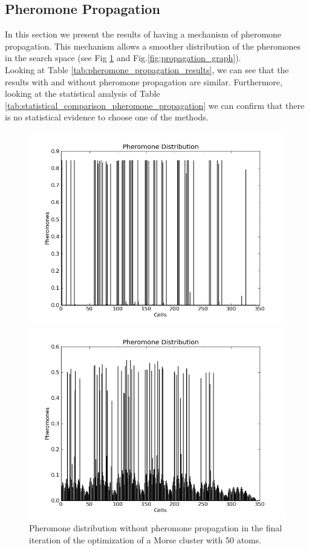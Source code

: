 		\subsection{Pheromone Propagation}
		In this section we present the results of having a mechanism of pheromone propagation. This mechanism allows a smoother distribution of the pheromones in the search space (see Fig \ref{fig:no_propagation_graph} and Fig.\ref{fig:propagation_graph}).\\
		Looking at Table \ref{tab:pheromone_propagation_results}, we can see that the results with and without pheromone propagation are similar. Furthermore, looking at the statistical analysis of Table \ref{tab:statistical_comparison_pheromone_propagation} we can confirm that there is no statistical evidence to choose one of the methods. 
		\begin{figure}[ht]
		\begin{minipage}[b]{0.5\linewidth}
		\centering
		\includegraphics[scale=0.35]{pictures/no_propagation_graph}
		\caption{Pheromone distribution without pheromone propagation in the final iteration of the optimization of a Morse cluster with 50 atoms.}
		\label{fig:no_propagation_graph}
		\end{minipage}
		\hspace{0.5cm}
		\begin{minipage}[b]{0.5\linewidth}
		\centering
		\includegraphics[scale=0.35]{pictures/propagation_graph}

\end{minipage}
\end{figure}
